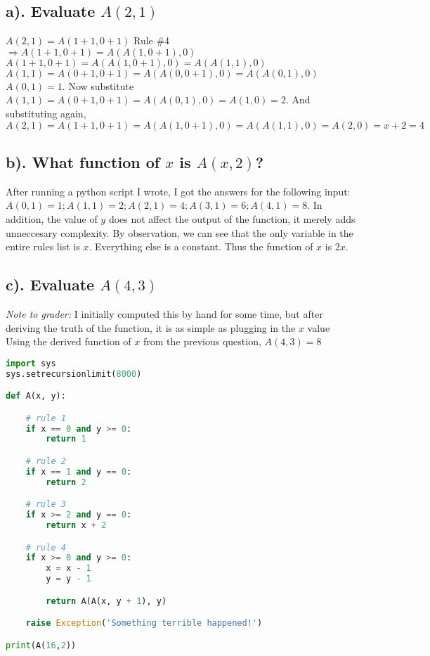 \documentclass[20pt]{article} %
\begin{document}
\subsection{a). Evaluate $A(2,1)$}
$A(2,1)=A(1+1, 0+1)$ Rule \#4 $\Rightarrow A(1+1, 0+1) = A(A(1, 0+1), 0)$ \\
$A(1+1, 0+1) = A(A(1, 0+1), 0) = A(A(1,1), 0)$ \\
$A(1,1) = A(0+1, 0+1) = A(A(0, 0+1), 0) = A(A(0,1),0)$ \\
$A(0,1) = 1$. Now substitute \\
$A(1,1) = A(0+1, 0+1) = A(A(0, 1),0) = A(1,0) = 2$. And substituting again, \\
$A(2,1) = A(1+1, 0+1) = A(A(1, 0+1), 0) = A(A(1,1), 0) = A(2, 0) = x+2 = 4$
\subsection{b). What function of $x$ is $A(x,2)$?}
After running a python script I wrote, I got the answers for the following input: \\
$A(0,1) = 1; A(1,1) = 2; A(2,1) = 4; A(3,1) = 6; A(4,1) = 8$.  In addition, the value of $y$ does not affect the output of the function, it merely adds unneccesary complexity.  By observation, we can see that the only variable in the entire rules list is $x$.  Everything else is a constant.  Thus the function of $x$ is $2x$.
\subsection{c). Evaluate $A(4,3)$}
\textit{Note to grader:} I initially computed this by hand for some time, but after deriving the truth of the function, it is as simple as plugging in the $x$ value\\
Using the derived function of $x$ from the previous question, $A(4,3) = 8$
\begin{lstlisting}[language=python]
import sys
sys.setrecursionlimit(8000)

def A(x, y):

    # rule 1
    if x == 0 and y >= 0:
        return 1

    # rule 2
    if x == 1 and y == 0:
        return 2

    # rule 3
    if x >= 2 and y == 0:
        return x + 2

    # rule 4
    if x >= 0 and y >= 0:
        x = x - 1
        y = y - 1

        return A(A(x, y + 1), y)

    raise Exception('Something terrible happened!')

print(A(16,2))
\end{lstlisting}
\end{document}
